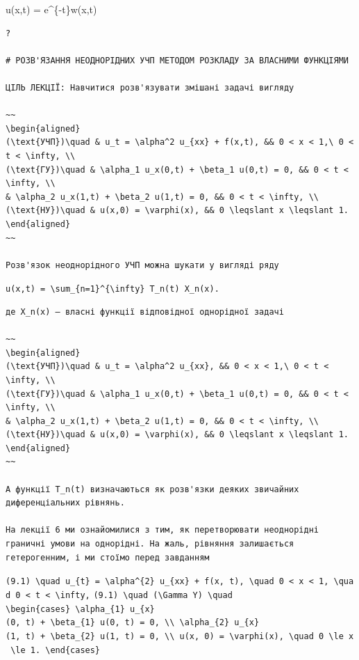 \documentclass[
  ukrainian,
]{article}
\begin{document}
u(x,t) = e\^{}\{-t\}w(x,t)

\begin{verbatim}
?

# РОЗВ'ЯЗАННЯ НЕОДНОРІДНИХ УЧП МЕТОДОМ РОЗКЛАДУ ЗА ВЛАСНИМИ ФУНКЦІЯМИ

ЦІЛЬ ЛЕКЦІЇ: Навчитися розв'язувати змішані задачі вигляду

~~
\begin{aligned}
(\text{УЧП})\quad & u_t = \alpha^2 u_{xx} + f(x,t), && 0 < x < 1,\ 0 < t < \infty, \\
(\text{ГУ})\quad & \alpha_1 u_x(0,t) + \beta_1 u(0,t) = 0, && 0 < t < \infty, \\
& \alpha_2 u_x(1,t) + \beta_2 u(1,t) = 0, && 0 < t < \infty, \\
(\text{НУ})\quad & u(x,0) = \varphi(x), && 0 \leqslant x \leqslant 1.
\end{aligned}
~~

Розв'язок неоднорідного УЧП можна шукати у вигляді ряду
\end{verbatim}

\texttt{u(x,t)\ =\ \textbackslash{}sum\_\{n=1\}\^{}\{\textbackslash{}infty\}\ T\_n(t)\ X\_n(x).}

\begin{verbatim}
де X_n(x) — власні функції відповідної однорідної задачі

~~
\begin{aligned}
(\text{УЧП})\quad & u_t = \alpha^2 u_{xx}, && 0 < x < 1,\ 0 < t < \infty, \\
(\text{ГУ})\quad & \alpha_1 u_x(0,t) + \beta_1 u(0,t) = 0, && 0 < t < \infty, \\
& \alpha_2 u_x(1,t) + \beta_2 u(1,t) = 0, && 0 < t < \infty, \\
(\text{НУ})\quad & u(x,0) = \varphi(x), && 0 \leqslant x \leqslant 1.
\end{aligned}
~~

А функції T_n(t) визначаються як розв'язки деяких звичайних диференціальних рівнянь.

На лекції 6 ми ознайомилися з тим, як перетворювати неоднорідні граничні умови на однорідні. На жаль, рівняння залишається гетерогенним, і ми стоїмо перед завданням
\end{verbatim}

\texttt{(9.1)\ \textbackslash{}quad\ u\_\{t\}\ =\ \textbackslash{}alpha\^{}\{2\}\ u\_\{xx\}\ +\ f(x,\ t),\ \textbackslash{}quad\ 0\ \textless{}\ x\ \textless{}\ 1,\ \textbackslash{}quad\ 0\ \textless{}\ t\ \textless{}\ \textbackslash{}infty,}
\texttt{(9.1)\ \textbackslash{}quad\ (\textbackslash{}Gamma\ Y)\ \textbackslash{}quad}
\texttt{\textbackslash{}begin\{cases\}\ \textbackslash{}alpha\_\{1\}\ u\_\{x\}(0,\ t)\ +\ \textbackslash{}beta\_\{1\}\ u(0,\ t)\ =\ 0,\ \textbackslash{}\textbackslash{}\ \textbackslash{}alpha\_\{2\}\ u\_\{x\}(1,\ t)\ +\ \textbackslash{}beta\_\{2\}\ u(1,\ t)\ =\ 0,\ \textbackslash{}\textbackslash{}\ u(x,\ 0)\ =\ \textbackslash{}varphi(x),\ \textbackslash{}quad\ 0\ \textbackslash{}le\ x\ \textbackslash{}le\ 1.\ \textbackslash{}end\{cases\}}
\end{document}
